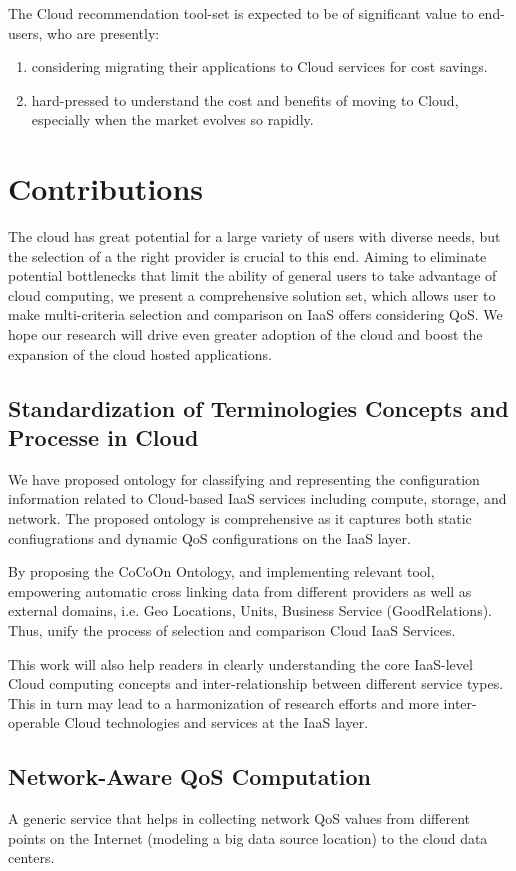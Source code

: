 The Cloud recommendation tool-set is expected to be of significant value to end-users, who are presently:
\begin{enumerate}
\item considering migrating their applications to Cloud services for cost savings.
\item hard-pressed to understand the cost and benefits of moving to Cloud, especially when the market evolves so rapidly.
\end{enumerate}

\section{Contributions}
The cloud has great potential for a large variety of users with diverse needs, but the selection of a the right provider is crucial to this end. Aiming to eliminate potential bottlenecks that limit the ability of general users to take advantage of cloud computing, we present a comprehensive solution set, which allows user to make multi-criteria selection and comparison on IaaS offers considering QoS. We hope our research will drive even greater adoption of the cloud and boost the expansion of the cloud hosted applications. 

\subsection{Standardization of Terminologies Concepts and Processe in Cloud}
We have proposed ontology for classifying and representing the configuration information related to Cloud-based IaaS services including compute, storage, and network. The proposed ontology is comprehensive as it captures both static confiugrations and dynamic QoS configurations on the IaaS layer.

By proposing the CoCoOn Ontology, and implementing relevant tool,
empowering automatic cross linking data from different providers as well as external domains,
i.e. Geo Locations, Units, Business Service (GoodRelations).
Thus, unify the process of selection and comparison Cloud IaaS Services.

This work will also help readers in clearly understanding the core IaaS-level Cloud computing concepts and inter-relationship between different service types. This in turn may lead to a harmonization of research efforts and more inter-operable Cloud technologies and services at the IaaS layer.

\subsection{Network-Aware QoS Computation}
A generic service that helps in collecting network QoS values
from different points on the Internet (modeling a big data source
location) to the cloud data centers.

